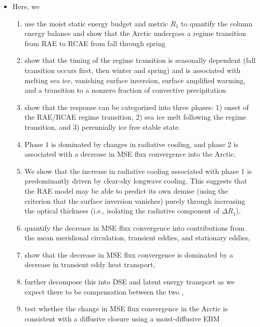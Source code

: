 \documentclass{article}
\begin{document}
\begin{itemize}
    \item Here, we 
    \begin{enumerate}
        \item use the moist static energy budget and metric $R_1$ to quantify the column energy balance and show that the Arctic undergoes a regime transition from RAE to RCAE from fall through spring
        \item show that the timing of the regime transition is seasonally dependent (fall transition occurs first, then winter and spring) and is associated with melting sea ice, vanishing surface inversion, surface amplified warming, and a transition to a nonzero fraction of convective precipitation
        \item show that the response can be categorized into three phases: 1) onset of the RAE/RCAE regime transition, 2) sea ice melt following the regime transition, and 3) perennially ice free stable state.
        \item Phase 1 is dominated by changes in radiative cooling, and phase 2 is associated with a decrease in MSE flux convergence into the Arctic.
        \item We show that the increase in radiative cooling associated with phase 1 is predominantly driven by clear-sky longwave cooling. This suggests that the RAE model \citep{cronin2016} may be able to predict its own demise (using the criterion that the surface inversion vanishes) purely through increasing the optical thickness (i.e., isolating the radiative component of $\Delta R_1$),
        \item quantify the decrease in MSE flux convergence into contributions from the mean meridional circulation, transient eddies, and stationary eddies,
        \item show that the decrease in MSE flux convergence is dominated by a decrease in transient eddy heat transport,
        \item further decompose this into DSE and latent energy transport as we expect there to be compensation between the two \citep{feldl2017},
        \item test whether the change in MSE flux convergence in the Arctic is consistent with a diffusive closure using a moist-diffusive EBM
    \end{enumerate}
\end{itemize}
\end{document}

